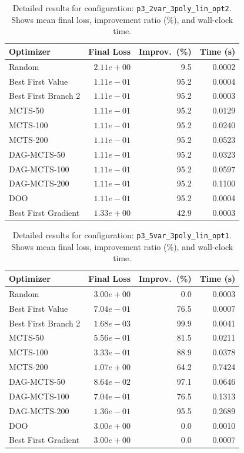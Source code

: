 \begin{table}[H]
\centering
\caption{Detailed results for configuration: \texttt{p3\_2var\_3poly\_lin\_opt2}. Shows mean final loss, improvement ratio (\%), and wall-clock time.}
\label{tab:abssum-detail-20}
\begin{tabular}{lrrr}
\toprule
Optimizer & Final Loss & Improv.~(\%) & Time (s) \\
\midrule
Random & $2.11e+00$ & 9.5 & 0.0002 \\
\hline
Best First Value & \textbf{$1.11e-01$} & 95.2 & 0.0004 \\
\hline
Best First Branch 2 & \textbf{$1.11e-01$} & 95.2 & 0.0003 \\
\hline
MCTS-50 & \textbf{$1.11e-01$} & 95.2 & 0.0129 \\
\hline
MCTS-100 & \textbf{$1.11e-01$} & 95.2 & 0.0240 \\
\hline
MCTS-200 & \textbf{$1.11e-01$} & 95.2 & 0.0523 \\
\hline
DAG-MCTS-50 & \textbf{$1.11e-01$} & 95.2 & 0.0323 \\
\hline
DAG-MCTS-100 & \textbf{$1.11e-01$} & 95.2 & 0.0597 \\
\hline
DAG-MCTS-200 & \textbf{$1.11e-01$} & 95.2 & 0.1100 \\
\hline
DOO & $1.11e-01$ & 95.2 & 0.0004 \\
\hline
Best First Gradient & $1.33e+00$ & 42.9 & 0.0003 \\
\bottomrule
\end{tabular}
\end{table}

\begin{table}[H]
\centering
\caption{Detailed results for configuration: \texttt{p3\_5var\_3poly\_lin\_opt1}. Shows mean final loss, improvement ratio (\%), and wall-clock time.}
\label{tab:abssum-detail-21}
\begin{tabular}{lrrr}
\toprule
Optimizer & Final Loss & Improv.~(\%) & Time (s) \\
\midrule
Random & $3.00e+00$ & 0.0 & 0.0003 \\
\hline
Best First Value & $7.04e-01$ & 76.5 & 0.0007 \\
\hline
Best First Branch 2 & \textbf{$1.68e-03$} & 99.9 & 0.0041 \\
\hline
MCTS-50 & $5.56e-01$ & 81.5 & 0.0211 \\
\hline
MCTS-100 & $3.33e-01$ & 88.9 & 0.0378 \\
\hline
MCTS-200 & $1.07e+00$ & 64.2 & 0.7424 \\
\hline
DAG-MCTS-50 & $8.64e-02$ & 97.1 & 0.0646 \\
\hline
DAG-MCTS-100 & $7.04e-01$ & 76.5 & 0.1313 \\
\hline
DAG-MCTS-200 & $1.36e-01$ & 95.5 & 0.2689 \\
\hline
DOO & $3.00e+00$ & 0.0 & 0.0010 \\
\hline
Best First Gradient & $3.00e+00$ & 0.0 & 0.0007 \\
\bottomrule
\end{tabular}
\end{table}


